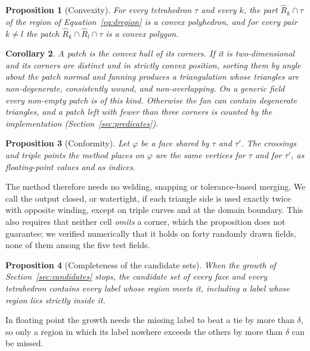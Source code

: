 \documentclass{egpubl}
\newtheorem{proposition}{Proposition}
\newtheorem{corollary}[proposition]{Corollary}
\theoremstyle{definition}
\newcommand{\tet}{\tau}
\newcommand{\dregion}[1]{\widehat{R}_{#1}}
\begin{document}
\begin{proposition}[Convexity]
\label{prop:convex}
For every tetrahedron $\tet$ and every $k$, the part $\dregion{k}\cap\tet$
of the region of Equation~\eqref{eq:dregion} is a convex polyhedron, and for every pair $k \neq l$ the patch
$\dregion{k}\cap\dregion{l}\cap\tet$ is a convex polygon.
\end{proposition}

\begin{corollary}
\label{cor:fan}
A patch is the convex hull of its corners. If it is two-dimensional and its
corners are distinct and in strictly convex position, sorting them by angle about the patch normal and fanning
produces a triangulation whose triangles are non-degenerate, consistently
wound, and non-overlapping. On a generic field every non-empty patch is of
this kind. Otherwise the fan can contain degenerate triangles, and a patch
left with fewer than three corners is counted by the implementation
(Section~\ref{sec:predicates}).
\end{corollary}

\begin{proposition}[Conformity]
\label{prop:conform}
Let $\varphi$ be a face shared by $\tet$ and $\tet'$. The crossings and triple
points the method places on $\varphi$ are the same vertices for $\tet$ and for
$\tet'$, as floating-point values and as indices.
\end{proposition}

\noindent The method therefore needs no welding, snapping or
tolerance-based merging. We call the output closed,
or watertight, if each triangle side is used exactly twice with opposite
winding, except on triple curves and at the domain boundary. This also
requires that neither cell \emph{omits} a corner, which the proposition does
not guarantee; we verified numerically that it holds on forty randomly drawn
fields, none of them among the five test fields.

\begin{proposition}[Completeness of the candidate sets]
\label{prop:complete}
When the growth of Section~\ref{sec:candidates} stops, the candidate set of
every face and every tetrahedron contains every label whose region meets it,
including a label whose region lies strictly inside it.
\end{proposition}

\noindent In floating point the growth needs the missing label to beat a tie
by more than $\delta$, so only a region in which its label nowhere exceeds
the others by more than $\delta$ can be missed.
\end{document}
